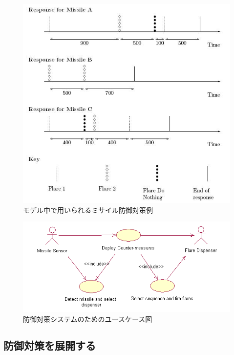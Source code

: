 \documentclass[\pformat,12pt]{jreport}
\begin{document}
\begin{figure}
\begin{center}
\includegraphics[width=\textwidth]{responses}
\end{center}
\caption{モデル中で用いられるミサイル防御対策例\label{fig:missileresp}}
\end{figure}

\begin{figure}
\begin{center}
\includegraphics[width=\textwidth]{CMusecases}
\end{center}
\caption{防御対策システムのためのユースケース図\label{fig:counteruse}}
\end{figure}

\subsection{防御対策を展開する}
\end{document}
